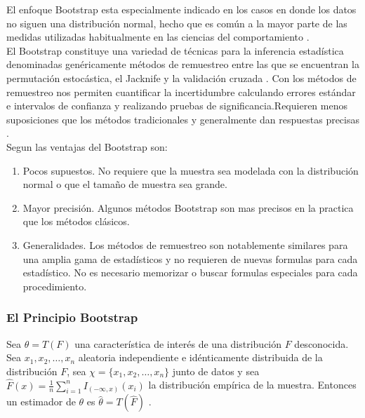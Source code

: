 El enfoque Bootstrap esta especialmente indicado en los casos en donde los datos no siguen una distribución normal, hecho que es común a la mayor parte de las medidas utilizadas habitualmente en las ciencias del comportamiento \parencite{micceri-1989}.\\


El Bootstrap constituye una variedad de técnicas para la inferencia estadística denominadas genéricamente métodos de remuestreo entre las que se encuentran la permutación estocástica, el Jacknife y la validación cruzada \parencite{balam-2012}. Con los métodos de remuestreo nos permiten cuantificar la incertidumbre calculando errores estándar e intervalos de confianza y realizando pruebas de significancia.Requieren menos suposiciones que los métodos tradicionales y generalmente dan respuestas precisas \parencite{hesterberg-2003} .\\


Segun \textcite{hesterberg-2003} las ventajas del Bootstrap son:

\begin{enumerate}
	\item  Pocos supuestos. No requiere que la muestra sea modelada con la distribución normal o que el tamaño de muestra sea grande.
	
	\item Mayor precisión. Algunos métodos Bootstrap son mas precisos en la practica que los métodos clásicos.
	
	\item Generalidades. Los métodos de remuestreo son notablemente similares para una amplia gama de estadísticos y no requieren de nuevas formulas para cada estadístico. No es necesario memorizar o buscar formulas especiales para cada procedimiento.
\end{enumerate}


\subsubsection{El Principio Bootstrap}
Sea $\theta =T(F)$ una característica de interés de una distribución $F$ desconocida. Sea $x_{1}, x_{2}, \dots, x_{n}$ aleatoria independiente e idénticamente distribuida de la distribución $F$, sea $\chi =\{ x_{1}, x_{2}, \dots, x_{n} \}$ junto de datos y sea $\hat{F}(x) = \frac{1}{n} \sum_{i=1}^{n} I _{(-\infty, x)} (x_{i})$ la distribución empírica de la muestra. Entonces un estimador de $\theta$ es $\hat{\theta} = T(\hat{F})$ \parencite{givens-2013} .\\

